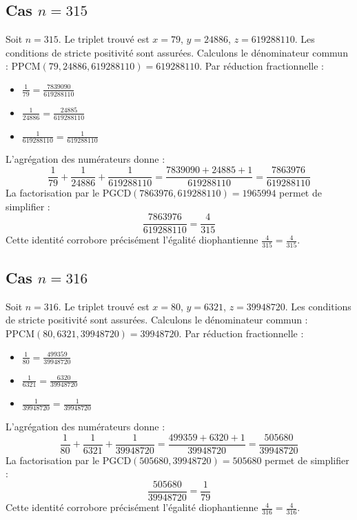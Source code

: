 \documentclass[11pt,a4paper]{article}
\begin{document}
\subsection{Cas $n = 315$}
Soit $n = 315$. Le triplet trouvé est $x = 79$, $y = 24886$, $z = 619288110$.
Les conditions de stricte positivité sont assurées.
Calculons le dénominateur commun : $\text{PPCM}(79, 24886, 619288110) = 619288110$.
Par réduction fractionnelle :
\begin{itemize}
    \item $\frac{1}{79} = \frac{7839090}{619288110}$
    \item $\frac{1}{24886} = \frac{24885}{619288110}$
    \item $\frac{1}{619288110} = \frac{1}{619288110}$
\end{itemize}
L'agrégation des numérateurs donne :
$$ \frac{1}{79} + \frac{1}{24886} + \frac{1}{619288110} = \frac{7839090 + 24885 + 1}{619288110} = \frac{7863976}{619288110} $$
La factorisation par le $\text{PGCD}(7863976, 619288110) = 1965994$ permet de simplifier :
$$ \frac{7863976}{619288110} = \frac{4}{315} $$
Cette identité corrobore précisément l'égalité diophantienne $\frac{4}{315} = \frac{4}{315}$.

\subsection{Cas $n = 316$}
Soit $n = 316$. Le triplet trouvé est $x = 80$, $y = 6321$, $z = 39948720$.
Les conditions de stricte positivité sont assurées.
Calculons le dénominateur commun : $\text{PPCM}(80, 6321, 39948720) = 39948720$.
Par réduction fractionnelle :
\begin{itemize}
    \item $\frac{1}{80} = \frac{499359}{39948720}$
    \item $\frac{1}{6321} = \frac{6320}{39948720}$
    \item $\frac{1}{39948720} = \frac{1}{39948720}$
\end{itemize}
L'agrégation des numérateurs donne :
$$ \frac{1}{80} + \frac{1}{6321} + \frac{1}{39948720} = \frac{499359 + 6320 + 1}{39948720} = \frac{505680}{39948720} $$
La factorisation par le $\text{PGCD}(505680, 39948720) = 505680$ permet de simplifier :
$$ \frac{505680}{39948720} = \frac{1}{79} $$
Cette identité corrobore précisément l'égalité diophantienne $\frac{4}{316} = \frac{4}{316}$.
\end{document}
